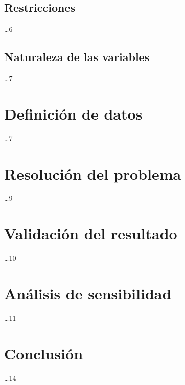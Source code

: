 \documentclass[letterpaper]{article}
\begin{document}
\begin{flushleft}
\subsection{Restricciones} \dots 6
\subsection{Naturaleza de las variables} \dots 7

\section{Definición de datos} \dots 7
\section{Resolución del problema} \dots 9
\section{Validación del resultado} \dots 10
\section{Análisis de sensibilidad} \dots 11
\section{Conclusión} \dots 14
\end{flushleft}
\end{document}
